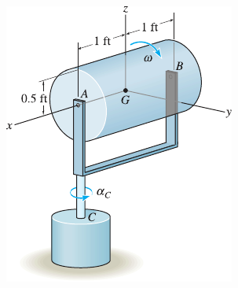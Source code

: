 \documentclass[11pt, english, a4paper, twoside]{article}
\begin{document}
\begin{enumerate}
\begin{minipage}[c][2cm][t]{0.3\textwidth}
		\includegraphics[width=\textwidth]{figures/hibbEng_21-58}
	\end{minipage}



\end{enumerate}
\end{document}
